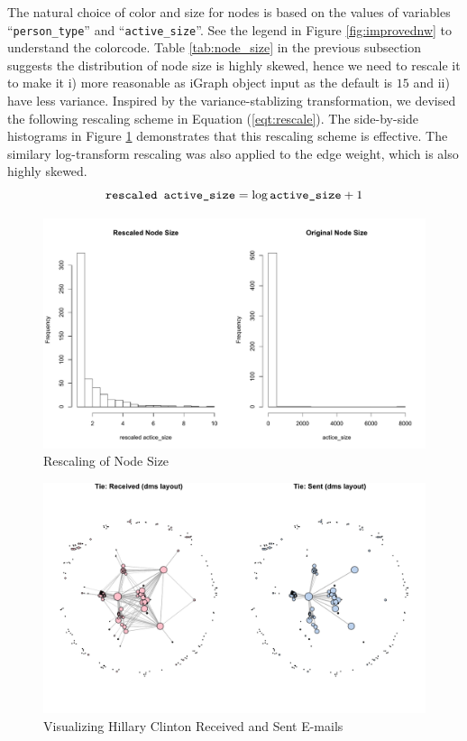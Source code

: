 \documentclass[11pt]{article}
\begin{document}
The natural choice of color and size for nodes is based on the values of variables ``\verb+person_type+'' and ``\verb+active_size+''. See the legend in Figure \ref{fig:improvednw} to understand the colorcode. Table \ref{tab:node_size} in the previous subsection suggests the distribution of node size is highly skewed, hence we need to rescale it to make it i) more reasonable as iGraph object input as the default is $15$ and ii) have less variance. Inspired by the variance-stablizing transformation, we devised the following rescaling scheme in Equation (\ref{eqt:rescale}). The side-by-side histograms in Figure \ref{fig:rescalenode} demonstrates that this rescaling scheme is effective. The similary log-transform rescaling was also applied to the edge weight, which is also highly skewed.
\begin{equation}
\label{eqt:rescale}
\verb+rescaled active_size+ = \log \verb+active_size+ + 1
\end{equation}
\begin{figure}[ht]
\caption{Rescaling of Node Size}
\label{fig:rescalenode}
\centering
\includegraphics[width=.9\textwidth]{report_rescaled_size}
\end{figure}
\begin{figure}[ht]
\caption{Visualizing Hillary Clinton Received and Sent E-mails}
\label{fig:splitnw}
\centering
\includegraphics[width=.9\textwidth]{report_network_compare}
\end{figure}
\end{document}
